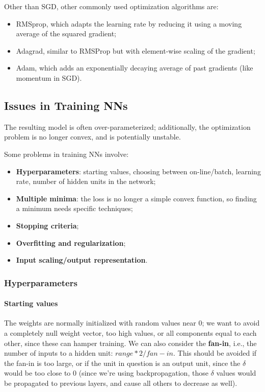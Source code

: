 Other than SGD, other commonly used optimization algorithms are:
\begin{itemize}
    \item RMSprop, which adapts the learning rate by reducing it using a moving average of the squared gradient;
    \item Adagrad, similar to RMSProp but with element-wise scaling of the gradient;
    \item Adam, which adds an exponentially decaying average of past gradients (like momentum in SGD).
\end{itemize}

\subsection{Issues in Training NNs}

The resulting model is often over-parameterized; additionally, the optimization problem is no longer convex, and is potentially unstable.

Some problems in training NNs involve:
\begin{itemize}
    \item \textbf{Hyperparameters}: starting values, choosing between on-line/batch, learning rate, number of hidden units in the network;

    \item \textbf{Multiple minima}: the loss is no longer a simple convex function, so finding a minimum needs specific techniques;

    \item \textbf{Stopping criteria};

    \item \textbf{Overfitting and regularization};

    \item \textbf{Input scaling/output representation}.
\end{itemize}

\subsubsection{Hyperparameters}

\paragraph{Starting values}

The weights are normally initialized with random values near 0; we want to avoid a completely null weight vector, too high values, or all components equal to each other, since these can hamper training. We can also consider the \textbf{fan-in}, i.e., the number of inputs to a hidden unit: $range * 2 /fan-in$. This should be avoided if the fan-in is too large, or if the unit in question is an output unit, since the $\delta$ would be too close to 0 (since we're using backpropagation, those $\delta$ values would be propagated to previous layers, and cause all others to decrease as well).

